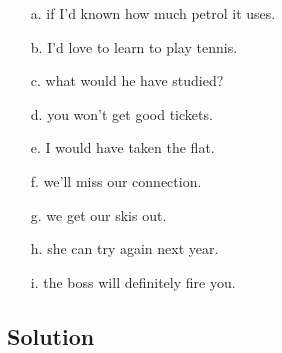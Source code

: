 \begin{enumerate}
      \item[a.] if I’d known how much petrol it uses.
      \item[b.] I’d love to learn to play tennis.
      \item[c.] what would he have studied?
      \item[d.] you won’t get good tickets.
      \item[e.] I would have taken the flat.
      \item[f.] we’ll miss our connection.
      \item[g.] we get our skis out.
      \item[h.] she can try again next year.
      \item[i.] the boss will definitely fire you.
\end{enumerate}

\subsection*{Solution}

